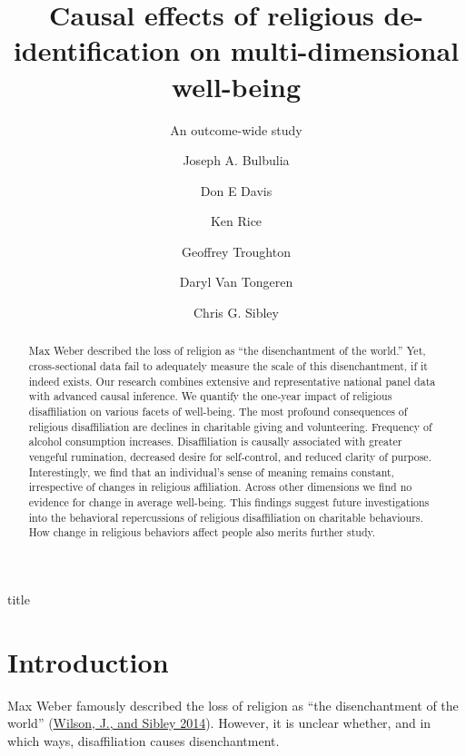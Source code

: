 \documentclass[
  singlecolumn]{report}
\title{Causal effects of religious de-identification on
multi-dimensional well-being}
\subtitle{An outcome-wide study}
\author{Joseph A. Bulbulia \and Don E Davis \and Ken Rice \and Geoffrey
Troughton \and Daryl Van Tongeren \and Chris G. Sibley}
\date{}
\begin{document}
\make title
\begin{abstract}
Max Weber described the loss of religion as ``the disenchantment of the
world.'' Yet, cross-sectional data fail to adequately measure the scale
of this disenchantment, if it indeed exists. Our research combines
extensive and representative national panel data with advanced causal
inference. We quantify the one-year impact of religious disaffiliation
on various facets of well-being. The most profound consequences of
religious disaffiliation are declines in charitable giving and
volunteering. Frequency of alcohol consumption increases. Disaffiliation
is causally associated with greater vengeful rumination, decreased
desire for self-control, and reduced clarity of purpose. Interestingly,
we find that an individual's sense of meaning remains constant,
irrespective of changes in religious affiliation. Across other
dimensions we find no evidence for change in average well-being. This
findings suggest future investigations into the behavioral repercussions
of religious disaffiliation on charitable behaviours. How change in
religious behaviors affect people also merits further study.
\end{abstract}
\ifdefined\Shaded\renewenvironment{Shaded}{\begin{tcolorbox}[interior hidden, enhanced, borderline west={3pt}{0pt}{shadecolor}, boxrule=0pt, frame hidden, sharp corners, breakable]}{\end{tcolorbox}}\fi

\listoffigures
\listoftables
\hypertarget{introduction}{%
\section{Introduction}\label{introduction}}

Max Weber famously described the loss of religion as ``the
disenchantment of the world''
(\protect\hyperlink{ref-wilson2014}{Wilson, J., and Sibley 2014}).
However, it is unclear whether, and in which ways, disaffiliation causes
disenchantment.
\end{document}
